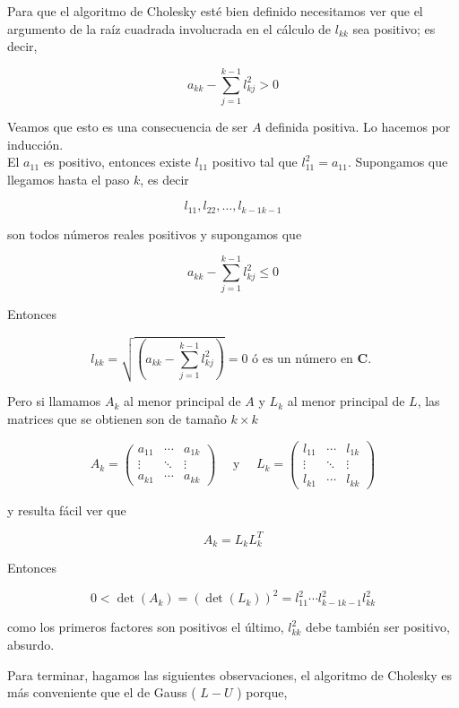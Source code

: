 \documentclass[10pt]{article}
\begin{document}
Para que el algoritmo de Cholesky esté bien definido necesitamos ver que el argumento de la raíz cuadrada involucrada en el cálculo de $l_{k k}$ sea positivo; es decir,

$$
a_{k k}-\sum_{j=1}^{k-1} l_{k j}^{2}>0
$$

Veamos que esto es una consecuencia de ser $A$ definida positiva. Lo hacemos por inducción.\\
El $a_{11}$ es positivo, entonces existe $l_{11}$ positivo tal que $l_{11}^{2}=a_{11}$. Supongamos que llegamos hasta el paso $k$, es decir

$$
l_{11}, l_{22}, \ldots, l_{k-1 k-1}
$$

son todos números reales positivos y supongamos que

$$
a_{k k}-\sum_{j=1}^{k-1} l_{k j}^{2} \leq 0
$$

Entonces

$$
l_{k k}=\sqrt{\left(a_{k k}-\sum_{j=1}^{k-1} l_{k j}^{2}\right)}=0 \text { ó es un número en } \boldsymbol{C} \text {. }
$$

Pero si llamamos $A_{k}$ al menor principal de $A$ y $L_{k}$ al menor principal de $L$, las matrices que se obtienen son de tamaño $k \times k$

$$
A_{k}=\left(\begin{array}{ccc}
a_{11} & \cdots & a_{1 k} \\
\vdots & \ddots & \vdots \\
a_{k 1} & \cdots & a_{k k}
\end{array}\right) \quad \text { y } \quad L_{k}=\left(\begin{array}{ccc}
l_{11} & \cdots & l_{1 k} \\
\vdots & \ddots & \vdots \\
l_{k 1} & \cdots & l_{k k}
\end{array}\right)
$$

y resulta fácil ver que

$$
A_{k}=L_{k} L_{k}^{T}
$$

Entonces

$$
0<\operatorname{det}\left(A_{k}\right)=\left(\operatorname{det}\left(L_{k}\right)\right)^{2}=l_{11}^{2} \cdots l_{k-1 k-1}^{2} l_{k k}^{2}
$$

como los primeros factores son positivos el último, $l_{k k}^{2}$ debe también ser positivo, absurdo.

Para terminar, hagamos las siguientes observaciones, el algoritmo de Cholesky es más conveniente que el de Gauss ( $L-U$ ) porque,
\end{document}
